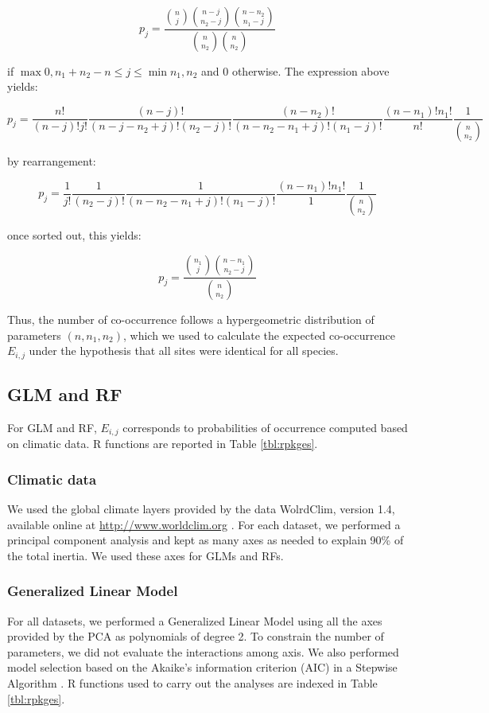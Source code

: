\[ p_j= \frac{\binom{n}{j} \binom{n-j}{n_2-j} \binom{n-n_2}{n_1-j}}{\binom{n}{n_2} \binom{n}{n_2}} \]

if \(\max{0, n_1+n_2-n} \leq j \leq \min{n_1, n_2}\) and 0 otherwise.
The expression above yields:

\[ p_j= \frac{n!}{(n-j)!j!} \frac{(n-j)!}{(n-j-n_2+j)!(n_2-j)!} \frac{(n-n_2)!}{(n-n_2-n_1+j)!(n_1-j)!} \frac{(n-n_1)!n_1!}{n!} \frac{1}{\binom{n}{n_2}} \]

by rearrangement:

\[ p_j= \frac{1}{j!} \frac{1}{(n_2-j)!} \frac{1}{(n-n_2-n_1+j)!(n_1-j)!} \frac{(n-n_1)!n_1!}{1} \frac{1}{\binom{n}{n_2}} \]

once sorted out, this yields:

\[ p_j= \frac{\binom{n_1}{j} \binom{n-n_1}{n_2-j}}{\binom{n}{n_2}} \]

Thus, the number of co-occurrence follows a hypergeometric distribution
of parameters \((n,n_1,n_2)\), which we used to calculate the expected
co-occurrence \(E_{i,j}\) under the hypothesis that all sites were
identical for all species.

\subsection{GLM and RF}\label{glm-and-rf}

For GLM and RF, \(E_{i,j}\) corresponds to probabilities of occurrence
computed based on climatic data. R functions are reported in Table
\ref{tbl:rpkges}.

\subsubsection{Climatic data}\label{climatic-data}

We used the global climate layers provided by the data WolrdClim,
version 1.4, available online at \url{http://www.worldclim.org}
\citep{Hijmans2005}. For each dataset, we performed a principal
component analysis and kept as many axes as needed to explain 90\% of
the total inertia. We used these axes for GLMs and RFs.

\subsubsection{Generalized Linear Model}\label{generalized-linear-model}

For all datasets, we performed a Generalized Linear Model
\citep{Elith2006} using all the axes provided by the PCA as polynomials
of degree 2. To constrain the number of parameters, we did not evaluate
the interactions among axis. We also performed model selection based on
the Akaike's information criterion (AIC) in a Stepwise Algorithm
\citep{burnham2013model}. R functions used to carry out the analyses are
indexed in Table \ref{tbl:rpkges}.

